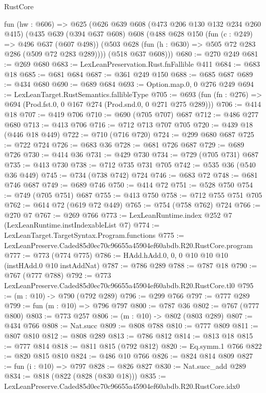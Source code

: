 \begin{lexlean}{RustCore}
\begin{coremodule}
  fun (hw : @606) =>
  @625
    (@626
      @639
      @608
      (@473 @206 @130 @132 @234 @260 @415)
      (@435
        @639
        (@394 @637 @608)
        @608
        (@488
          @628
          @150
          (fun (c : @249) => @496 @637 (@607 @498))
          (@503 @628 (fun (h : @630) => @505 @72 @283 @286 (@509 @72 @283 @289))))
        (@518 @637 @608)))
@680 := @270 @249
@681 := @269 @680
@683 := LexLeanPreservation.Rust.fnFallible @411
@684 := @683 @18
@685 := @681 @684
@687 := @361 @249 @150
@688 := @685 @687
@689 := @434 @680
@690 := @689 @684
@693 := Option.map.{0, 0} @276 @249
@694 := LexLeanTarget.RustSemantics.fallibleType
@705 := @693 (fun (fn : @276) => @694 (Prod.fst.{0, 0} @167 @274 (Prod.snd.{0, 0} @271 @275 @289)))
@706 := @414 @18
@707 := @419 @706
@710 := @690 (@705 @707) @687
@712 := @486 @277 @680
@713 := @413 @706
@716 := @712 @713 @707 @705
@720 := @439 @18 (@446 @18 @449)
@722 := @710 (@716 @720)
@724 := @299 @680 @687
@725 := @722 @724
@726 := @683 @36
@728 := @681 @726 @687
@729 := @689 @726
@730 := @414 @36
@731 := @429 @730
@734 := @729 (@705 @731) @687
@735 := @413 @730
@738 := @712 @735 @731 @705
@742 := @535 @36 (@540 @36 @449)
@745 := @734 (@738 @742) @724
@746 := @683 @72
@748 := @681 @746 @687
@749 := @689 @746
@750 := @414 @72
@751 := @528 @750
@754 := @749 (@705 @751) @687
@755 := @413 @750
@758 := @712 @755 @751 @705
@762 := @614 @72 (@619 @72 @449)
@765 := @754 (@758 @762) @724
@766 := @270 @7
@767 := @269 @766
@773 := LexLeanRuntime.index @252 @7 (LexLeanRuntime.instIndexableList @7)
@774 := LexLeanTarget.TargetSyntax.Program.functions
@775 := LexLeanPreserve.Caded85d0ec70c96655a45904ef60abdb.R20.RustCore.program
@777 := @773 (@774 @775)
@786 := HAdd.hAdd.{0, 0, 0} @10 @10 @10 (instHAdd.{0} @10 instAddNat)
@787 := @786 @289
@788 := @787 @18
@790 := @767 (@777 @788)
@792 := @773 LexLeanPreserve.Caded85d0ec70c96655a45904ef60abdb.R20.RustCore.tl0
@795 := (m : @10) -> @790 (@792 @289)
@796 := @299 @766
@797 := @777 @289
@799 := fun (m : @10) => @796 @797
@800 := @787 @36
@802 := @767 (@777 @800)
@803 := @773 @257
@806 := (m : @10) -> @802 (@803 @289)
@807 := @434 @766
@808 := Nat.succ
@809 := @808 @788
@810 := @777 @809
@811 := @807 @810
@812 := @808 @289
@813 := @786 @812
@814 := @813 @18
@815 := @777 @814
@818 := @811 @815 (@792 @812)
@820 := Eq.symm.{1} @766
@822 := @820 @815 @810
@824 := @486 @10 @766
@826 := @824 @814 @809
@827 := fun (i : @10) => @797
@828 := @826 @827
@830 := Nat.succ_add @289
@834 := @818 (@822 (@828 (@830 @18)))
@835 := LexLeanPreserve.Caded85d0ec70c96655a45904ef60abdb.R20.RustCore.idx0

\end{coremodule}
\end{lexlean}
